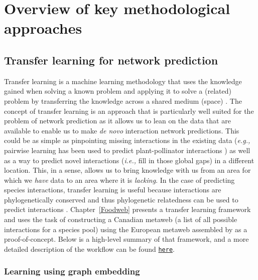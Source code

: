 \section{Overview of key methodological approaches}

\subsection{Transfer learning for network prediction}\label{transfer-learning-for-network-prediction}

Transfer learning is a machine learning methodology that uses the 
knowledge gained when solving a known problem and
applying it to solve a (related) problem by transferring the knowledge
across a shared medium (space) \cite{Torrey2010TraLea, Pan2010SurTra}.
The concept of transfer learning is an approach that is particularly well suited for the problem of network
prediction as it allows us to lean on the data that are available to 
enable us to make \emph{de novo} interaction network predictions. This could be as simple as pinpointing missing interactions in the existing data 
(\emph{e.g.,} pairwise learning has been used to predict plant-pollinator
interactions \cite{Stock2021PaiLea}) as well as a way to predict
novel interactions (\emph{i.e.,} fill in those global gaps) in a different location. This, in a sense, allows us to bring knowledge with us from an area for which we \emph{have} data to an area where it is \emph{lacking}. In the case of predicting species interactions, transfer learning is useful because interactions are phylogenetically conserved and thus phylogenetic relatedness can be used to predict interactions \cite{Davies2021EcoRed, Elmasri2020HieBay, Gomez2010EcoInt}. Chapter~\ref{Foodweb} presents a transfer learning framework and uses the task of constructing a Canadian metaweb (a list of all possible interactions for a species pool) using the European metaweb assembled by \cite{Maiorano2020TetSpe} as a proof-of-concept. Below is a high-level summary of that framework, and a more detailed description of the workflow can be found \href{https://osf.io/2zwqm/}{\texttt{here}}.

\subsubsection{Learning using graph embedding}\label{learning~using~embedding}

